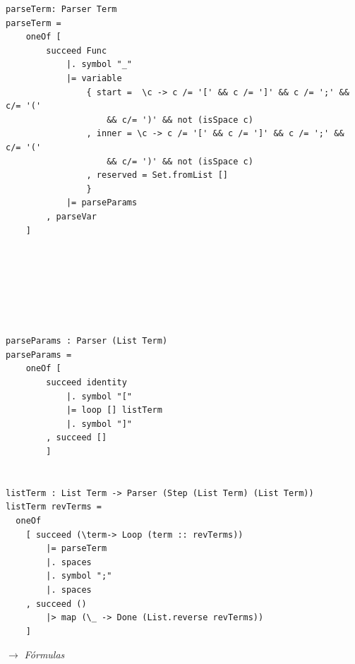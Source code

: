 \documentclass[a4paper]{report}
\begin{document}
\begin{lstlisting}[caption={ParserLPO. Definición de Términos.}, mathescape=true]
parseTerm: Parser Term 
parseTerm =
    oneOf [
        succeed Func
            |. symbol "_"
            |= variable
                { start =  \c -> c /= '[' && c /= ']' && c /= ';' && c/= '(' 
                    && c/= ')' && not (isSpace c)
                , inner = \c -> c /= '[' && c /= ']' && c /= ';' && c/= '(' 
                    && c/= ')' && not (isSpace c)
                , reserved = Set.fromList []
                }
            |= parseParams
        , parseVar
    ]







parseParams : Parser (List Term)
parseParams =
    oneOf [
        succeed identity
            |. symbol "["
            |= loop [] listTerm
            |. symbol "]"
        , succeed []
        ]
  

listTerm : List Term -> Parser (Step (List Term) (List Term))
listTerm revTerms =
  oneOf
    [ succeed (\term-> Loop (term :: revTerms))
        |= parseTerm
        |. spaces
        |. symbol ";"
        |. spaces
    , succeed ()
        |> map (\_ -> Done (List.reverse revTerms))
    ]
\end{lstlisting}

\noindent $\longrightarrow$ \textit{Fórmulas}
\end{document}
